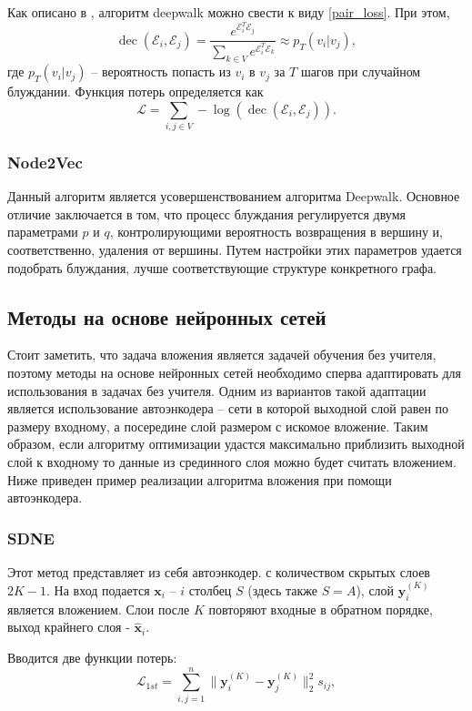 \documentclass[12pt,a4paper]{extarticle}
\newcommand{\E}{\mathcal{E}}
\newcommand{\Loss}{\mathcal{L}}
\newcommand{\decoder}{\operatorname{dec}}
\begin{document}
    Как описано в \cite{survey2}, алгоритм deepwalk можно свести к виду \eqref{pair_loss}. При этом,
    \[
    \decoder(\E_i, \E_j) = \frac{e^{\E_i^T\E_j}}{\sum_{k \in V} e^{\E_i^T\E_k}} \approx p_T(v_i | v_j),
    \]
    где $p_T(v_i | v_j)$ -- вероятность попасть из $v_i$ в $v_j$ за $T$ шагов при случайном блуждании. Функция потерь определяется как
    \[
    \Loss = \sum_{i, j \in V} -\log(\decoder(\E_i, \E_j)).
    \]
    
    \subsubsection{Node2Vec \cite{node2vec}}
    Данный алгоритм является усовершенствованием алгоритма Deepwalk.
    Основное отличие заключается в том, что процесс блуждания регулируется двумя параметрами $p$ и $q$, контролирующими вероятность возвращения в вершину и, соответственно, удаления от вершины.
    Путем настройки этих параметров удается подобрать блуждания, лучше соответствующие структуре конкретного графа.
    
    \subsection{Методы на основе нейронных сетей}
    Стоит заметить, что задача вложения является задачей обучения без учителя, поэтому методы на основе нейронных сетей необходимо сперва адаптировать для использования в задачах без учителя.
    Одним из вариантов такой адаптации является использование автоэнкодера -- сети в которой выходной слой равен по размеру входному, а посередине слой размером с искомое вложение.
    Таким образом, если алгоритму оптимизации удастся максимально приблизить выходной слой к входному то данные из срединного слоя можно будет считать вложением.
    Ниже приведен пример реализации алгоритма вложения при помощи автоэнкодера.
    
    \subsubsection{SDNE \cite{sdne}}
    
    Этот метод представляет из себя автоэнкодер. с количеством скрытых слоев $2K - 1$. На вход подается $\mathbf{x}_i$ -- $i$ столбец $S$ (здесь также $S = A$), слой $\mathbf{y}_i^{(K)}$ является вложением. Слои после $K$ повторяют входные в обратном порядке, выход крайнего слоя - $\mathbf{\hat{x}}_i$.
    
    Вводится две функции потерь:
    $$
    \Loss_{1st} = \sum_{i,j=1}^{n} \lVert \mathbf{y}_i^{(K)} - \mathbf{y}_j^{(K)} \rVert_2^2 s_{ij},
    $$
    
\end{document}
